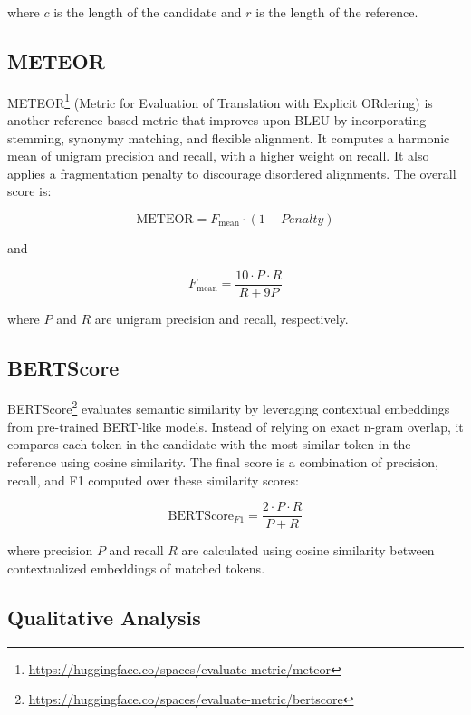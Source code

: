 where \( c \) is the length of the candidate and \( r \) is the length of the reference.

\subsection{METEOR}

METEOR\footnote{\url{https://huggingface.co/spaces/evaluate-metric/meteor}} (Metric for Evaluation of Translation with Explicit ORdering) is another
reference-based metric that improves upon BLEU by incorporating stemming, synonymy
matching, and flexible alignment. It computes a harmonic mean of unigram precision and
recall, with a higher weight on recall. It also applies a fragmentation penalty to discourage
disordered alignments. The overall score is:

\begin{equation}
  \text{METEOR} = F_{\text{mean}} \cdot (1 - Penalty)
\end{equation}

and

\begin{equation}
  F_{\text{mean}} = \frac{10 \cdot P \cdot R}{R + 9P}
\end{equation}

where \( P \) and \( R \) are unigram precision and recall, respectively.

\subsection{BERTScore}

BERTScore\footnote{\url{https://huggingface.co/spaces/evaluate-metric/bertscore}} evaluates semantic similarity by leveraging contextual embeddings from
pre-trained BERT-like models. Instead of relying on exact n-gram overlap, it compares
each token in the candidate with the most similar token in the reference using cosine
similarity. The final score is a combination of precision, recall, and F1 computed over
these similarity scores:

\begin{equation}
  \text{BERTScore}_{F1} = \frac{2 \cdot P \cdot R}{P + R}
\end{equation}

where precision \( P \) and recall \( R \) are calculated using cosine similarity between contextualized
embeddings of matched tokens.

\subsection{Qualitative Analysis}


